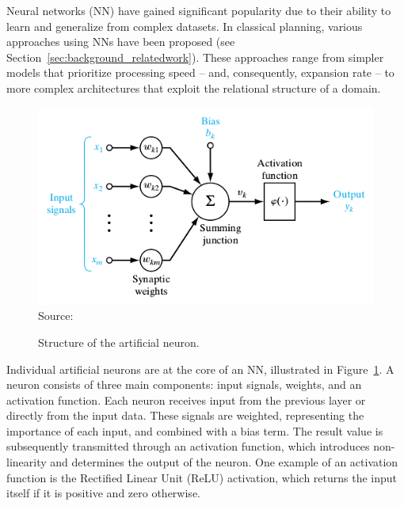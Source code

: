Neural networks (NN) have gained significant popularity due to their ability to learn and generalize from complex datasets. In classical planning, various approaches using NNs have been proposed (see Section~\ref{sec:background_relatedwork}). These approaches range from simpler models that prioritize processing speed -- and, consequently, expansion rate -- to more complex architectures that exploit the relational structure of a domain.

\begin{figure}[ht]
    \caption{Structure of the artificial neuron.}
    \label{fig:neuron}
    \centering
    \includegraphics[width=0.9\linewidth]{figures/neuron.png} \\
    Source:~\cite{Haykin/2009}
\end{figure}

Individual artificial neurons are at the core of an NN, illustrated in Figure~\ref{fig:neuron}. A neuron consists of three main components: input signals, weights, and an activation function. Each neuron receives input from the previous layer or directly from the input data. These signals are weighted, representing the importance of each input, and combined with a bias term. The result value is subsequently transmitted through an activation function, which introduces non-linearity and determines the output of the neuron. One example of an activation function is the Rectified Linear Unit (ReLU) activation, which returns the input itself if it is positive and zero otherwise.

